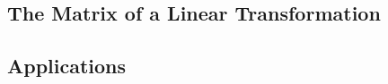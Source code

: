 \documentclass{article}
\begin{document}
    \subsection{The Matrix of a Linear Transformation}
    \begin{outline}
        \1 
    \end{outline}
    \subsection{Applications}
    \begin{outline}
        \1 
    \end{outline}
\end{document}
